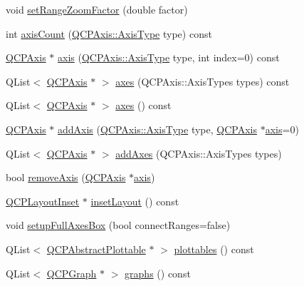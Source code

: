 \begin{DoxyCompactItemize}
void \hyperlink{classQCPAxisRect_ae83d187b03fc6fa4f00765ad50cd3fc3}{set\-Range\-Zoom\-Factor} (double factor)
\item 
int \hyperlink{classQCPAxisRect_a16e3e4646e52e4b5d5b865076c29ae58}{axis\-Count} (\hyperlink{classQCPAxis_ae2bcc1728b382f10f064612b368bc18a}{\-Q\-C\-P\-Axis\-::\-Axis\-Type} type) const 
\item 
\hyperlink{classQCPAxis}{\-Q\-C\-P\-Axis} $\ast$ \hyperlink{classQCPAxisRect_a560de44e47a4af0f86c59102a094b1e4}{axis} (\hyperlink{classQCPAxis_ae2bcc1728b382f10f064612b368bc18a}{\-Q\-C\-P\-Axis\-::\-Axis\-Type} type, int index=0) const 
\item 
\-Q\-List$<$ \hyperlink{classQCPAxis}{\-Q\-C\-P\-Axis} $\ast$ $>$ \hyperlink{classQCPAxisRect_a66654d51ca611ef036ded36250cd2518}{axes} (\-Q\-C\-P\-Axis\-::\-Axis\-Types types) const 
\item 
\-Q\-List$<$ \hyperlink{classQCPAxis}{\-Q\-C\-P\-Axis} $\ast$ $>$ \hyperlink{classQCPAxisRect_a18dcdc0dd6c7520bc9f3d15a7a3feec2}{axes} () const 
\item 
\hyperlink{classQCPAxis}{\-Q\-C\-P\-Axis} $\ast$ \hyperlink{classQCPAxisRect_a2dc336092ccc57d44a46194c8a23e4f4}{add\-Axis} (\hyperlink{classQCPAxis_ae2bcc1728b382f10f064612b368bc18a}{\-Q\-C\-P\-Axis\-::\-Axis\-Type} type, \hyperlink{classQCPAxis}{\-Q\-C\-P\-Axis} $\ast$\hyperlink{classQCPAxisRect_a560de44e47a4af0f86c59102a094b1e4}{axis}=0)
\item 
\-Q\-List$<$ \hyperlink{classQCPAxis}{\-Q\-C\-P\-Axis} $\ast$ $>$ \hyperlink{classQCPAxisRect_a792e1f3d9cb1591fca135bb0de9b81fc}{add\-Axes} (\-Q\-C\-P\-Axis\-::\-Axis\-Types types)
\item 
bool \hyperlink{classQCPAxisRect_a03c39cd9704f0d36fb6cf980cdddcbaa}{remove\-Axis} (\hyperlink{classQCPAxis}{\-Q\-C\-P\-Axis} $\ast$\hyperlink{classQCPAxisRect_a560de44e47a4af0f86c59102a094b1e4}{axis})
\item 
\hyperlink{classQCPLayoutInset}{\-Q\-C\-P\-Layout\-Inset} $\ast$ \hyperlink{classQCPAxisRect_a4114887c7141b59650b7488f930993e5}{inset\-Layout} () const 
\item 
void \hyperlink{classQCPAxisRect_a5fa906175447b14206954f77fc7f1ef4}{setup\-Full\-Axes\-Box} (bool connect\-Ranges=false)
\item 
\-Q\-List$<$ \hyperlink{classQCPAbstractPlottable}{\-Q\-C\-P\-Abstract\-Plottable} $\ast$ $>$ \hyperlink{classQCPAxisRect_a5b0d629c8de5572945eeae79a142296e}{plottables} () const 
\item 
\-Q\-List$<$ \hyperlink{classQCPGraph}{\-Q\-C\-P\-Graph} $\ast$ $>$ \hyperlink{classQCPAxisRect_afa4ff90901d9275f670e24b40e3c1b25}{graphs} () const 

\end{DoxyCompactItemize}
